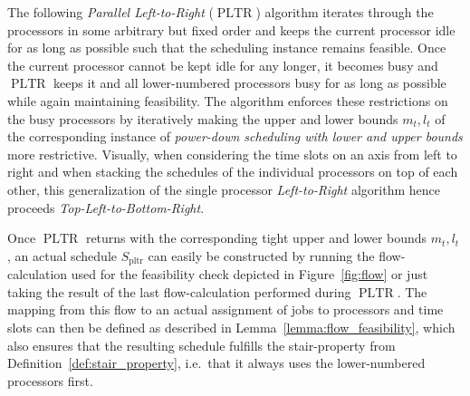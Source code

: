 \documentclass[a4paper]{article}
\DeclareMathOperator{\pltr}{pltr}
\DeclareMathOperator{\PLTR}{PLTR}
\begin{document}
The following \emph{Parallel Left-to-Right} ($\PLTR$) algorithm iterates through the processors in some arbitrary but fixed order and keeps the current processor idle for as long as possible such that the scheduling instance remains feasible.
Once the current processor cannot be kept idle for any longer, it becomes busy and $\PLTR$ keeps it and all lower-numbered processors busy for as long as possible while again maintaining feasibility.
The algorithm enforces these restrictions on the busy processors by iteratively making the upper and lower bounds $m_t, l_t$ of the corresponding instance of \emph{power-down scheduling with lower and upper bounds} more restrictive.
Visually, when considering the time slots on an axis from left to right and when stacking the schedules of the individual processors on top of each other, this generalization of the single processor \emph{Left-to-Right} algorithm hence proceeds \emph{Top-Left-to-Bottom-Right}.

Once $\PLTR$ returns with the corresponding tight upper and lower bounds $m_t, l_t$ , an actual schedule $S_{\pltr}$ can easily be constructed by running the flow-calculation used for the feasibility check depicted in Figure~\ref{fig:flow} or just taking the result of the last flow-calculation performed during $\PLTR$.
The mapping from this flow to an actual assignment of jobs to processors and time slots can then be defined as described in Lemma~\ref{lemma:flow_feasibility}, which also ensures that the resulting schedule fulfills the stair-property from Definition~\ref{def:stair_property}, i.e.\ that it always uses the lower-numbered processors first.
\end{document}
